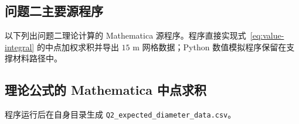 \begin{appendices}
\section{问题二主要源程序}\label{app:q2code}
以下列出问题二理论计算的 Mathematica 源程序。程序直接实现式~\eqref{eq:value-integral}
的中点加权求积并导出 $15$ m 网格数据；Python 数值模拟程序保留在支撑材料路径中。

\subsection{理论公式的 Mathematica 中点求积}
程序运行后在自身目录生成 \texttt{Q2\_expected\_diameter\_data.csv}。





\end{appendices}



